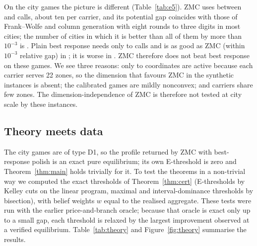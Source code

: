 \documentclass[preprint,12pt]{elsarticle}
\theoremstyle{definition}
\theoremstyle{remark}
\begin{document}
On the city games the picture is different (Table~\ref{tab:e5}). ZMC uses between \EfiveCallsZMCmin{} and \EfiveCallsZMCmax{} calls, about ten per carrier, and its potential gap coincides with those of Frank--Wolfe and column generation with eight rounds to three digits in most cities; the number of cities in which it is better than all of them by more than $10^{-3}$ is \EfiveZMCstrictBestN. Plain best response needs only \EfiveCallsBRmin{} to \EfiveCallsBRmax{} calls and is as good as ZMC (within $10^{-3}$ relative gap) in \EfiveBRasgoodCities; it is worse in \EfiveBRworseCities. ZMC therefore does not beat best response on these games. We see three reasons: only \EfiveDeffMin{} to \EfiveDeffMax{} coordinates are active because each carrier serves 22 zones, so the dimension that favours ZMC in the synthetic instances is absent; the calibrated games are mildly nonconvex; and carriers share few zones. The dimension-independence of ZMC is therefore not tested at city scale by these instances.

\begin{table}[t]\centering\small
\caption{Methods on the nine city games (seed 0, earlier price-and-branch oracle). $d_{\rm eff}$: active coordinates. Oracle calls (left block) and relative potential gap to the convexified optimum, in \% (right block), for best response (BR), ZMC with eight rounds, Frank--Wolfe and column generation with eight rounds (FW, CG8) and column generation to convergence (CG); all methods end with the same best-response polish.}\label{tab:e5}
\end{table}

\subsection{Theory meets data}\label{sec:res-theory}

The city games are of type D1, so the profile returned by ZMC with best-response polish is an exact pure equilibrium; its own E-threshold is zero and Theorem~\ref{thm:main} holds trivially for it. To test the theorems in a non-trivial way we computed the exact thresholds of Theorem~\ref{thm:cert} (E-thresholds by Kelley cuts on the linear program, maximal and interval-dominance thresholds by bisection), with belief weights $w$ equal to the realised aggregate. These tests were run with the earlier price-and-branch oracle; because that oracle is exact only up to a small gap, each threshold is relaxed by the largest improvement observed at a verified equilibrium. Table~\ref{tab:theory} and Figure~\ref{fig:theory} summarise the results.
\end{document}
